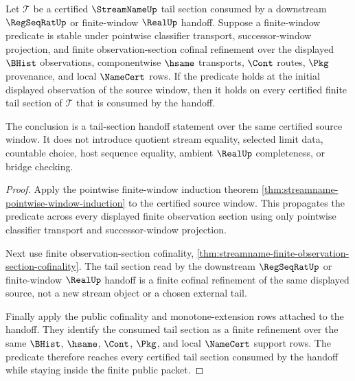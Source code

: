 \begin{theorem}
\label{thm:streamname-pointwise-window-induction-tail-section}
Let $\mathcal T$ be a certified $\StreamNameUp$ tail section consumed by a downstream $\RegSeqRatUp$ or finite-window $\RealUp$ handoff. Suppose a finite-window predicate is stable under pointwise classifier transport, successor-window projection, and finite observation-section cofinal refinement over the displayed $\BHist$ observations, componentwise $\hsame$ transports, $\Cont$ routes, $\Pkg$ provenance, and local $\NameCert$ rows. If the predicate holds at the initial displayed observation of the source window, then it holds on every certified finite tail section of $\mathcal T$ that is consumed by the handoff.

The conclusion is a tail-section handoff statement over the same certified source window. It does not introduce quotient stream equality, selected limit data, countable choice, host sequence equality, ambient $\RealUp$ completeness, or bridge checking.
\end{theorem}
\begin{proof}
Apply the pointwise finite-window induction theorem
\autoref{thm:streamname-pointwise-window-induction} to the certified source
window. This propagates the predicate across every displayed finite observation
section using only pointwise classifier transport and successor-window
projection.

Next use finite observation-section cofinality,
\autoref{thm:streamname-finite-observation-section-cofinality}. The tail
section read by the downstream $\RegSeqRatUp$ or finite-window $\RealUp$
handoff is a finite cofinal refinement of the same displayed source, not a new
stream object or a chosen external tail.

Finally apply the public cofinality and monotone-extension rows attached to the
handoff. They identify the consumed tail section as a finite refinement over
the same $\BHist$, $\hsame$, $\Cont$, $\Pkg$, and local $\NameCert$ support
rows. The predicate therefore reaches every certified tail section consumed by
the handoff while staying inside the finite public packet.
\end{proof}


